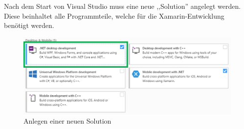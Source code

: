 Nach dem Start von Visual Studio muss eine neue ,,Solution'' angelegt werden. Diese beinhaltet alle Programmteile, welche für die Xamarin-Entwicklung benötigt werden. 

\begin{figure}[H]
    \centering\includegraphics[width=0.9\linewidth]{images/auswahl_rahmenwerk/installation2.png}    
    \caption{Anlegen einer neuen Solution}
\end{figure}







